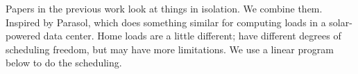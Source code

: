 
Papers in the previous work look at things in isolation.  We combine them.  Inspired by Parasol, which does something similar for computing loads in a solar-powered data center.  Home loads are a little different; have different degrees of scheduling freedom, but may have more limitations.  We use a linear program below to do the scheduling.